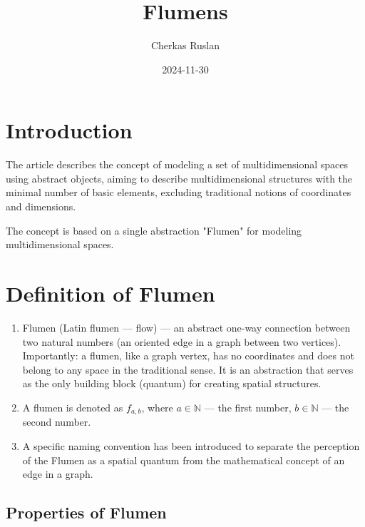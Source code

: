 \documentclass[final]{article}
\begin{document}
    \title{Flumens}
    \author{Cherkas Ruslan}
    \date{2024-11-30}

    \maketitle
    \tableofcontents


    \section{Introduction}

        The article describes the concept of modeling a set of multidimensional 
        spaces using abstract objects, aiming to describe multidimensional 
        structures with the minimal number of basic elements, excluding 
        traditional notions of coordinates and dimensions.

        The concept is based on a single abstraction "Flumen" for modeling 
        multidimensional spaces.

    \section{Definition of Flumen}

        \begin{enumerate}

            \item Flumen (Latin flumen — flow) — an abstract one-way connection 
            between two natural numbers (an oriented edge in a graph between two 
            vertices). Importantly: a flumen, like a graph vertex, has no 
            coordinates and does not belong to any space in the traditional 
            sense. It is an abstraction that serves as the only building block 
            (quantum) for creating spatial structures.

            \item A flumen is denoted as \( f_{a,b} \), where \( a \in 
            \mathbb{N} \) — the first number, \( b \in \mathbb{N} \) — the 
            second number.

            \item A specific naming convention has been introduced to separate 
            the perception of the Flumen as a spatial quantum from the 
            mathematical concept of an edge in a graph.

        \end{enumerate}


    \subsection{Properties of Flumen}
\end{document}
